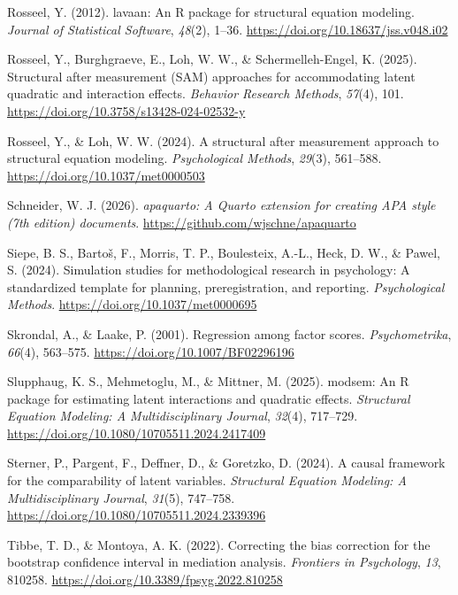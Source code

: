 \documentclass[
  man,
  longtable,
  nolmodern,
  notxfonts,
  notimes,
  colorlinks=true,linkcolor=blue,citecolor=blue,urlcolor=blue]{apa7}
\newlength{\cslhangindent}
\newenvironment{CSLReferences}[2] %
 {\begin{list}{}{%
  \setlength{\itemindent}{0pt}
  \setlength{\leftmargin}{0pt}
  \setlength{\parsep}{0pt}
  \ifodd #1
   \setlength{\leftmargin}{\cslhangindent}
   \setlength{\itemindent}{-1\cslhangindent}
  \fi
  \setlength{\itemsep}{#2\baselineskip}}}
 {\end{list}}
\begin{document}
\begin{CSLReferences}{1}{0}
Rosseel, Y. (2012). {lavaan}: An {R} package for structural equation
modeling. \emph{Journal of Statistical Software}, \emph{48}(2), 1--36.
\url{https://doi.org/10.18637/jss.v048.i02}

Rosseel, Y., Burghgraeve, E., Loh, W. W., \& Schermelleh-Engel, K.
(2025). Structural after measurement ({SAM}) approaches for
accommodating latent quadratic and interaction effects. \emph{Behavior
Research Methods}, \emph{57}(4), 101.
\url{https://doi.org/10.3758/s13428-024-02532-y}

Rosseel, Y., \& Loh, W. W. (2024). A structural after measurement
approach to structural equation modeling. \emph{Psychological Methods},
\emph{29}(3), 561--588. \url{https://doi.org/10.1037/met0000503}

Schneider, W. J. (2026). \emph{{apaquarto}: A {Quarto} extension for
creating {APA} style ({7th} edition) documents}.
\url{https://github.com/wjschne/apaquarto}

Siepe, B. S., Bartoš, F., Morris, T. P., Boulesteix, A.-L., Heck, D. W.,
\& Pawel, S. (2024). Simulation studies for methodological research in
psychology: A standardized template for planning, preregistration, and
reporting. \emph{Psychological Methods}.
\url{https://doi.org/10.1037/met0000695}

Skrondal, A., \& Laake, P. (2001). Regression among factor scores.
\emph{Psychometrika}, \emph{66}(4), 563--575.
\url{https://doi.org/10.1007/BF02296196}

Slupphaug, K. S., Mehmetoglu, M., \& Mittner, M. (2025). {modsem}: An
{R} package for estimating latent interactions and quadratic effects.
\emph{Structural Equation Modeling: A Multidisciplinary Journal},
\emph{32}(4), 717--729.
\url{https://doi.org/10.1080/10705511.2024.2417409}

Sterner, P., Pargent, F., Deffner, D., \& Goretzko, D. (2024). A causal
framework for the comparability of latent variables. \emph{Structural
Equation Modeling: A Multidisciplinary Journal}, \emph{31}(5), 747--758.
\url{https://doi.org/10.1080/10705511.2024.2339396}

Tibbe, T. D., \& Montoya, A. K. (2022). Correcting the bias correction
for the bootstrap confidence interval in mediation analysis.
\emph{Frontiers in Psychology}, \emph{13}, 810258.
\url{https://doi.org/10.3389/fpsyg.2022.810258}


\end{CSLReferences}
\end{document}
